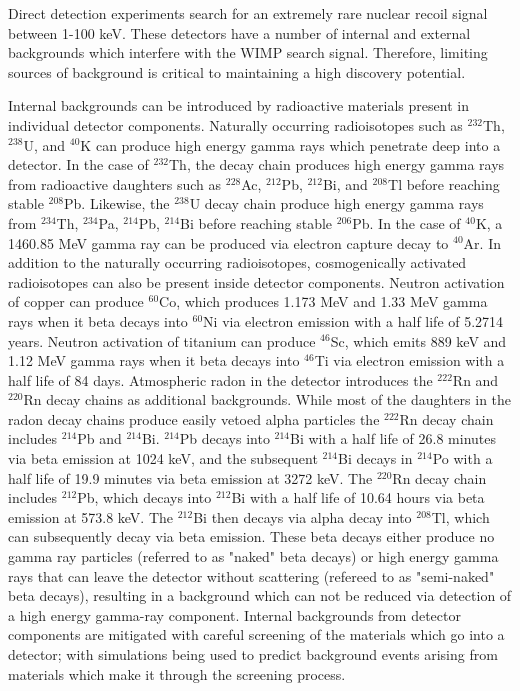 \documentclass[a4paper,12pt]{article}
\begin{document}
Direct detection experiments search for an extremely rare nuclear recoil signal between 1-100 keV.  These detectors have a number of internal and external backgrounds which interfere with the WIMP search signal.  Therefore, limiting sources of background is critical to maintaining a high discovery potential.  

Internal backgrounds can be introduced by radioactive materials present in individual detector components.  Naturally occurring radioisotopes such as $^{232}$Th, $^{238}$U, and $^{40}$K can produce high energy gamma rays which penetrate deep into a detector.  In the case of $^{232}$Th, the decay chain produces high energy gamma rays from radioactive daughters such as $^{228}$Ac, $^{212}$Pb, $^{212}$Bi, and $^{208}$Tl before reaching stable $^{208}$Pb.  Likewise, the $^{238}$U decay chain produce high energy gamma rays from $^{234}$Th, $^{234}$Pa, $^{214}$Pb, $^{214}$Bi before reaching stable $^{206}$Pb.  In the case of $^{40}$K, a 1460.85 MeV gamma ray can be produced via electron capture decay to $^{40}$Ar.  In addition to the naturally occurring radioisotopes, cosmogenically activated radioisotopes can also be present inside detector components.  Neutron activation of copper can produce $^{60}$Co, which produces 1.173 MeV and 1.33 MeV gamma rays when it beta decays into $^{60}$Ni via electron emission with a half life of 5.2714 years.  Neutron activation of titanium can produce $^{46}$Sc, which emits 889 keV and 1.12 MeV gamma rays when it beta decays into $^{46}$Ti via electron emission with a half life of 84 days.  Atmospheric radon in the detector introduces the $^{222}$Rn and $^{220}$Rn decay chains as additional backgrounds. While most of the daughters in the radon decay chains produce easily vetoed alpha particles the $^{222}$Rn decay chain includes $^{214}$Pb and $^{214}$Bi.  $^{214}$Pb decays into $^{214}$Bi with a half life of 26.8 minutes via beta emission at 1024 keV, and the subsequent $^{214}$Bi decays in $^{214}$Po with a half life of 19.9 minutes via beta emission at 3272 keV.  The $^{220}$Rn decay chain includes $^{212}$Pb, which decays into $^{212}$Bi with a half life of 10.64 hours via beta emission at 573.8 keV.  The $^{212}$Bi then decays via alpha decay into $^{208}$Tl, which can subsequently decay via beta emission.  These beta decays either produce no gamma ray particles (referred to as "naked" beta decays) or high energy gamma rays that can leave the detector without scattering (refereed to as "semi-naked" beta decays), resulting in a background which can not be reduced via detection of a high energy gamma-ray component.  Internal backgrounds from detector components are mitigated with careful screening of the materials which go into a detector; with simulations being used to predict background events arising from materials which make it through the screening process.
	 	
\end{document}
